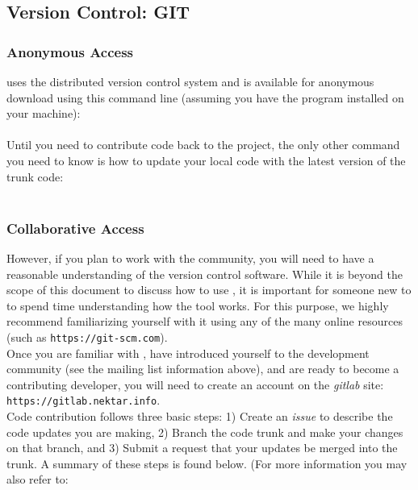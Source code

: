 
\subsection{Version Control: GIT}

\subsubsection{Anonymous Access}

{\nek} uses the {\GIT} distributed version control system and
is available for anonymous download using this command line (assuming you
have the {\GIT} program installed on your machine): \\

\\

Until you need to contribute code back to the project, the
only other {\GIT} command you need to know is how to update your
local code with the latest version of the trunk code:\\

 \\

\subsubsection{Collaborative Access}

However, if you plan to work with the {\nek} community, you will
need to have a reasonable understanding of the {\GIT} version control
software.  While it is beyond the scope of this document to discuss
how to use {\GIT}, it is important for someone new to {\GIT} to spend
time understanding how the tool works.  For this purpose, we highly
recommend familiarizing yourself with it using any of the many online
resources (such as \texttt{https://git-scm.com}). \\

Once you are familiar with {\GIT}, have introduced yourself to the
development community (see the mailing list information above), and
are ready to become a contributing developer, you will need to create
an account on the {\nek} \textit{gitlab} site:
\texttt{https://gitlab.nektar.info}. \\

Code contribution follows three basic steps: 1) Create an
\textit{issue} to describe the code updates you are making, 2)
Branch the {\nek} code trunk and make your changes on that branch,
and 3) Submit a request that your updates be merged into the trunk.
A summary of these steps is found below.  (For more information you may
also refer to: \\

